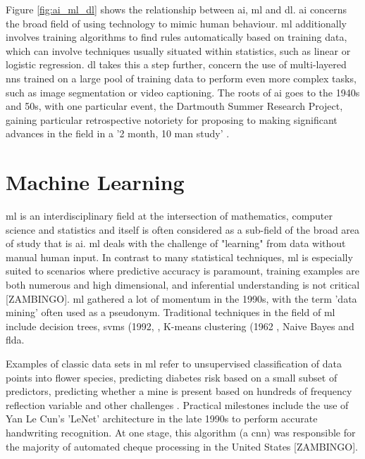 Figure \ref{fig:ai_ml_dl} shows the relationship between \gls{ai}, \gls{ml} and \gls{dl}. \gls{ai} concerns the broad field of using technology to mimic human behaviour. \gls{ml} additionally involves training algorithms to find rules automatically based on training data, which can involve techniques usually situated within statistics, such as linear or logistic regression. \gls{dl} takes this a step further, concern the use of multi-layered \gls{nn}s trained on a large pool of training data to perform even more complex tasks, such as image segmentation or video captioning. The roots of \gls{ai} goes to the 1940s and 50s, with one particular event, the Dartmouth Summer Research Project, gaining particular retrospective notoriety for proposing to making significant advances in the field in a '2 month, 10 man study'  \cite{dartmouth_summer}.

\section{Machine Learning}

\gls{ml} is an interdisciplinary field at the intersection of mathematics, computer science and statistics and itself is often considered as a sub-field of the broad area of study that is  \gls{ai}. \gls{ml} deals with the challenge of "learning" from data without manual human input. In contrast to many statistical techniques, \gls{ml} is especially suited to scenarios where predictive accuracy is paramount, training examples are both numerous and high dimensional, and inferential understanding is not critical [ZAMBINGO]. \gls{ml} gathered a lot of momentum in the 1990s, with the term 'data mining' often used as a pseudonym. Traditional techniques in the field of \gls{ml} include decision trees,  \gls{svm}s (1992, \cite{svm}, K-means clustering (1962 \cite{k_means}, Naive Bayes and  \gls{flda}.  \bigskip

Examples of classic data sets in \gls{ml} refer to unsupervised classification of data points into flower species, predicting diabetes risk based on a small subset of predictors, predicting whether a mine is present based on hundreds of frequency reflection variable and other challenges \cite{uci_ml_data}. Practical milestones include the use of Yan Le Cun's 'LeNet' architecture in the late 1990s to perform accurate handwriting recognition. At one stage, this algorithm (a \gls{cnn}) was responsible for the majority of automated cheque processing in the United States [ZAMBINGO].  \bigskip

